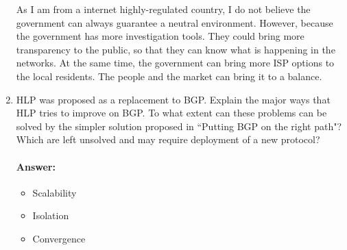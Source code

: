 \documentclass[a4paper,11pt]{article}
\theoremstyle{mytheor}
\begin{document}
\begin{enumerate}
As I am from a internet highly-regulated country, I do not believe the government can always guarantee a neutral environment.
However, because the government has more investigation tools. 
They could bring more transparency to the public, so that they can know what is happening in the networks.
At the same time, the government can bring more ISP options to the local residents.
The people and the market can bring it to a balance.

\item
HLP was proposed as a replacement to BGP. 
Explain the major ways that HLP tries to improve on BGP. 
To what extent can these problems can be solved by the simpler solution proposed in ``Putting BGP on the
right path"? 
Which are left unsolved and may require deployment of a new protocol?
\paragraph{Answer:}
\begin{itemize}
\item Scalability
\item Isolation
\item Convergence
\end{itemize}

\end{enumerate}
\end{document}
